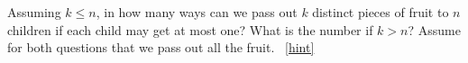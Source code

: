 \documentclass{book}
\begin{document}
\setcounter{project}{90}
\addtocounter{project}{-1}
\begin{activity}[]\label{activity-83}
\hypertarget{p-687}{}%
Assuming \(k\le n\), in how many ways can we pass out \(k\) distinct pieces of fruit to \(n\) children if each child may get at most one? What is the number if \(k>n\)? Assume for both questions that we pass out all the fruit.%
~\hfill{\tiny\hyperlink{a-90}{[hint]}\hypertarget{q-90}{}}\end{activity}
\end{document}
